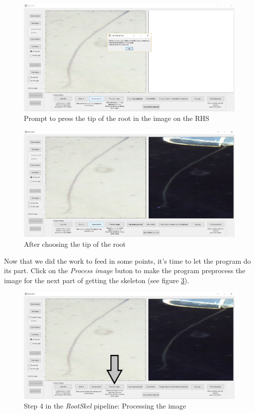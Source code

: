 \begin{figure}[H]
	\centering
	\includegraphics[width=\textwidth]{../Figures/manual/step11.jpg}
	\caption{Prompt to press the tip of the root in the image on the RHS}
	\label{fig:img14}
\end{figure}

\begin{figure}[H]
	\centering
	\includegraphics[width=\textwidth]{../Figures/manual/step12.jpg}
	\caption{After choosing the tip of the root}
	\label{fig:img15}
\end{figure}

Now that we did the work to feed in some points, it's time to let the program do its part. Click on the \textit{Process image} buton to make the program preprocess the image for the next part of getting the skeleton (see figure \ref{fig:img16}).

\begin{figure}[H]
	\centering
	\includegraphics[width=\textwidth]{../Figures/manual/step13.jpg}
	\caption{Step 4 in the \textit{RootSkel} pipeline: Processing the image}
	\label{fig:img16}
\end{figure}

